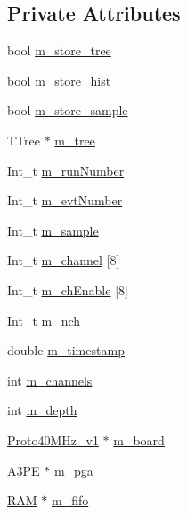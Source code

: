 \subsection*{Private Attributes}
\begin{DoxyCompactItemize}
\item 
bool \hyperlink{classAcquisition_aca2143e9135e25554e58327475a767c5}{m\+\_\+store\+\_\+tree}
\item 
bool \hyperlink{classAcquisition_a08f70edd83751dbdab4c8190dc4b9188}{m\+\_\+store\+\_\+hist}
\item 
bool \hyperlink{classAcquisition_a987cc1d04007cf1f5acc1accfd0909e5}{m\+\_\+store\+\_\+sample}
\item 
T\+Tree $\ast$ \hyperlink{classAcquisition_a70f10db9c972f22a60bd2b82750168da}{m\+\_\+tree}
\item 
Int\+\_\+t \hyperlink{classAcquisition_afd35e220e0bfda7e763584524273aeb0}{m\+\_\+run\+Number}
\item 
Int\+\_\+t \hyperlink{classAcquisition_a32a70daa3f653eae5eafc46dbd0e11a6}{m\+\_\+evt\+Number}
\item 
Int\+\_\+t \hyperlink{classAcquisition_a154e5423720ab1f2c4ab5cd125cb4e80}{m\+\_\+sample}
\item 
Int\+\_\+t \hyperlink{classAcquisition_a1123502b520aec97ee8a71039abaa3fb}{m\+\_\+channel} \mbox{[}8\mbox{]}
\item 
Int\+\_\+t \hyperlink{classAcquisition_ad323c9602565eec8e41f573d441745e2}{m\+\_\+ch\+Enable} \mbox{[}8\mbox{]}
\item 
Int\+\_\+t \hyperlink{classAcquisition_a1860c7a03a65ea7a778d30dd4a40e1e1}{m\+\_\+nch}
\item 
double \hyperlink{classAcquisition_aa88cf8d27e075b5aaddb309dfb42cd04}{m\+\_\+timestamp}
\item 
int \hyperlink{classAcquisition_aedc8b29f322ef00540797fbd0d5112d1}{m\+\_\+channels}
\item 
int \hyperlink{classAcquisition_a26628424533a2dd74d24712a14637a72}{m\+\_\+depth}
\item 
\hyperlink{classProto40MHz__v1}{Proto40\+M\+Hz\+\_\+v1} $\ast$ \hyperlink{classAcquisition_a9b0db99be79d61ae78dae8a9e4efceab}{m\+\_\+board}
\item 
\hyperlink{classA3PE}{A3\+PE} $\ast$ \hyperlink{classAcquisition_aac113fd42c6574cdb4154e9808a21b67}{m\+\_\+pga}
\item 
\hyperlink{classRAM}{R\+AM} $\ast$ \hyperlink{classAcquisition_a8a893e7485e96da01185df6d1109c0bc}{m\+\_\+fifo}
\item 

\end{DoxyCompactItemize}
